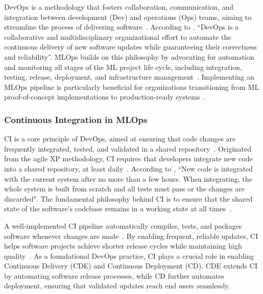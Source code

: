 DevOps is a methodology that fosters collaboration, communication, and integration between development (Dev) and operations (Ops) teams, aiming to streamline the process of delivering software~\citep{ebert2016devops}.
According to \cite{leite2019survey}, ``DevOps is a collaborative and multidisciplinary organizational effort to automate the continuous delivery of new software updates while guaranteeing their correctness and reliability''.
MLOps builds on this philosophy by advocating for automation and monitoring all stages of the ML project life cycle, including integration, testing, release, deployment, and infrastructure management~\citep{karamitsos2020applying}. 
Implementing an MLOps pipeline is particularly beneficial for organizations transitioning from ML proof-of-concept implementations to production-ready systems~\citep{makinen2021needs}.


\subsubsection{Continuous Integration in MLOps}

CI is a core principle of DevOps, aimed at ensuring that code changes are frequently integrated, tested, and validated in a shared repository~\citep{fowler-ci-2006, duvall2007continuous}. 
Originated from the agile XP methodology, CI requires that developers integrate new code into a shared repository, at least daily~\citep{fowler-ci-2006, duvall2007continuous}. 
According to \cite{beck2000extreme}, ``New code is integrated with the current system after no more than a few hours. When integrating, the whole system is built from scratch and all tests must pass or the changes are discarded". 
The fundamental philosophy behind CI is to ensure that the shared state of the software's codebase remains in a working state at all times~\citep{duvall2007continuous}. 

A well-implemented CI pipeline automatically compiles, tests, and packages software whenever changes are made~\citep{bernardo2023}. By enabling frequent, reliable updates, CI helps software projects achieve shorter release cycles while maintaining high quality~\citep{bosch2014continuous}. As a foundational DevOps practice, CI plays a crucial role in enabling Continuous Delivery (CDE) and Continuous Deployment (CD)\citep{yarlagadda2018understanding, lwakatare2016relationship}. CDE extends CI by automating software release processes, while CD further automates deployment, ensuring that validated updates reach end users seamlessly\citep{karvonen2017systematic}.

